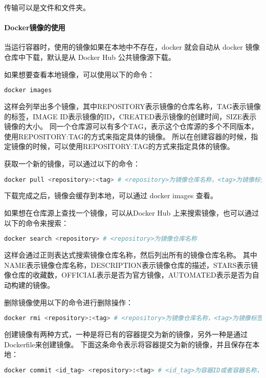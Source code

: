 \documentclass[lang=cn,a4paper,newtx]{elegantpaper}
\begin{document}
传输可以是文件和文件夹。
\paragraph{Docker镜像的使用}
当运行容器时，使用的镜像如果在本地中不存在，docker 就会自动从 docker 镜像仓库中下载，默认是从 Docker Hub 公共镜像源下载。

如果想要查看本地镜像，可以使用以下的命令：
\begin{lstlisting}[language=bash]
  docker images
\end{lstlisting}
这样会列举出多个镜像，其中REPOSITORY表示镜像的仓库名称，TAG表示镜像的标签，IMAGE ID表示镜像的ID，CREATED表示镜像的创建时间，SIZE表示镜像的大小。
同一个仓库源可以有多个TAG，表示这个仓库源的多个不同版本，使用REPOSITORY:TAG的方式来指定具体的镜像。
所以在创建容器的时候，指定镜像的时候，可以使用REPOSITORY:TAG的方式来指定具体的镜像。

获取一个新的镜像，可以通过以下的命令：
\begin{lstlisting}[language=bash]
  docker pull <repository>:<tag> # <repository>为镜像仓库名称，<tag>为镜像标签
\end{lstlisting}
下载完成之后，镜像会缓存到本地，可以通过 docker images 查看。

如果想在仓库源上查找一个镜像，可以从Docker Hub 上来搜索镜像，也可以通过以下的命令来搜索：
\begin{lstlisting}[language=bash]
  docker search <repository> # <repository>为镜像仓库名称
\end{lstlisting}
这样会通过正则表达式搜索镜像仓库名称，然后列出所有的镜像仓库名称。
其中NAME表示镜像仓库名称，DESCRIPTION表示镜像仓库的描述，STARS表示镜像仓库的收藏数，OFFICIAL表示是否为官方镜像，AUTOMATED表示是否为自动构建的镜像。

删除镜像使用以下的命令进行删除操作：
\begin{lstlisting}[language=bash]
  docker rmi <repository>:<tag> # <repository>为镜像仓库名称，<tag>为镜像标签
\end{lstlisting}

创建镜像有两种方式，一种是将已有的容器提交为新的镜像，另外一种是通过Dockerfile来创建镜像。
下面这条命令表示将容器提交为新的镜像，并且保存在本地：
\begin{lstlisting}[language=bash]
  docker commit <id_tag> <repository>:<tag> # <id_tag>为容器ID或者容器名称，<repository>为镜像仓库名称，<tag>为镜像标签
\end{lstlisting}
\end{document}
